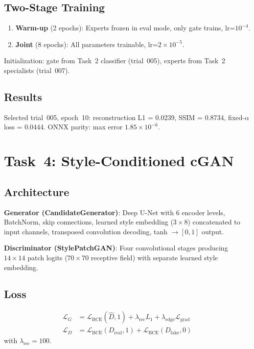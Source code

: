 \documentclass[conference]{IEEEtran}
\begin{document}
\subsection{Two-Stage Training}
\begin{enumerate}
\item \textbf{Warm-up} (2 epochs): Experts frozen in eval mode, only gate trains, lr=$10^{-4}$.
\item \textbf{Joint} (8 epochs): All parameters trainable, lr=$2 \times 10^{-5}$.
\end{enumerate}
Initialization: gate from Task~2 classifier (trial~005), experts from Task~2 specialists (trial~007).

\subsection{Results}
Selected trial~005, epoch~10: reconstruction L1 = 0.0239, SSIM = 0.8734, fixed-$\alpha$ loss = 0.0444. ONNX parity: max error $1.85 \times 10^{-6}$.


\section{Task~4: Style-Conditioned cGAN}

\subsection{Architecture}
\textbf{Generator (CandidateGenerator)}: Deep U-Net with 6 encoder levels, BatchNorm, skip connections, learned style embedding ($3 \times 8$) concatenated to input channels, transposed convolution decoding, tanh $\to [0,1]$ output.

\textbf{Discriminator (StylePatchGAN)}: Four convolutional stages producing $14 \times 14$ patch logits ($70 \times 70$ receptive field) with separate learned style embedding.

\subsection{Loss}
\begin{align}
\mathcal{L}_G &= \mathcal{L}_{\text{BCE}}(\hat{D}, 1) + \lambda_{\text{rec}} L_1 + \lambda_{\text{edge}} \mathcal{L}_{\text{grad}} \\
\mathcal{L}_D &= \mathcal{L}_{\text{BCE}}(D_{\text{real}}, 1) + \mathcal{L}_{\text{BCE}}(D_{\text{fake}}, 0)
\end{align}
with $\lambda_{\text{rec}} = 100$.
\end{document}
